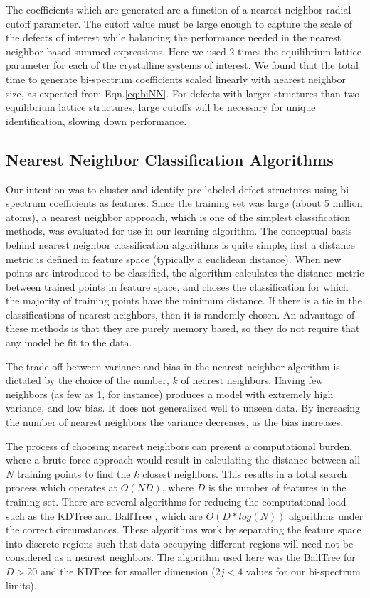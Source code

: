 \documentclass[12pt]{iopart}
\begin{document}
The coefficients which are generated are a function of a nearest-neighbor radial cutoff parameter. The cutoff value must be large enough to capture the scale of the defects of interest while balancing the performance needed in the nearest neighbor based summed expressions. Here we used 2 times the equilibrium lattice parameter for each of the crystalline systems of interest. We found that the total time to generate bi-spectrum coefficients scaled linearly with nearest neighbor size, as expected from Eqn.\ref{eq:biNN}. For defects with larger structures than two equilibrium lattice structures, large cutoffs will be necessary for unique identification, slowing down performance.

\subsection{Nearest Neighbor Classification Algorithms}

Our intention was to cluster and identify pre-labeled defect structures using bi-spectrum coefficients as features. Since the training set was large (about 5 million atoms), a nearest neighbor approach\cite{Hastie2001,Bentley1975, Omohundro1989}, which is one of the simplest classification methods, was evaluated for use in our learning algorithm. The conceptual basis behind nearest neighbor classification algorithms is quite simple, first a distance metric is defined in feature space (typically a euclidean distance). When new points are introduced to be classified, the algorithm calculates the distance metric between trained points in feature space, and choses the classification for which the majority of training points have the minimum distance. If there is a tie in the classifications of nearest-neighbors, then it is randomly chosen. An advantage of these methods is that they are purely memory based, so they do not require that any model be fit to the data.

The trade-off between variance and bias in the nearest-neighbor algorithm is dictated by the choice of the number, $k$ of nearest neighbors. Having few neighbors (as few as 1, for instance) produces a model with extremely high variance, and low bias. It does not generalized well to unseen data.  By increasing the number of nearest neighbors the variance decreases, as the bias increases. 

The process of choosing nearest neighbors can present a computational burden, where a brute force approach would result in calculating the distance between all $N$ training points to find the $k$ closest neighbors. This results in a total search process which operates at $O(ND)$, where $D$ is the number of features in the training set.  There are several algorithms for reducing the computational load such as the KDTree \cite{Bentley1975} and BallTree \cite{Omohundro1989}, which are $O(D*log(N))$ algorithms under the correct circumstances. These algorithms work by separating the feature space into discrete regions such that data occupying different regions will need not be considered as a nearest neighbors. The algorithm used here was the BallTree \cite{Bentley1975} for $D>20$ and the KDTree for smaller dimension ($2j<4$ values for our bi-spectrum limits).
\end{document}
